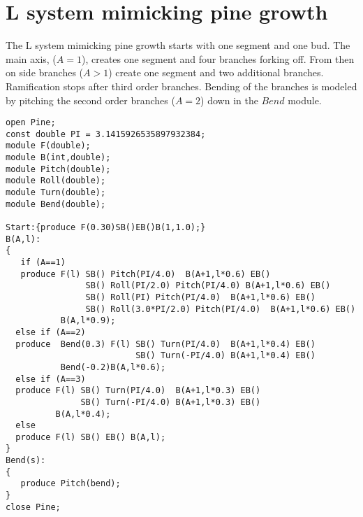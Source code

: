 \section{L system mimicking pine growth}\label{sec:L1}
The L system  mimicking pine  growth starts with  one segment  and one
bud.  The main axis, ($A  = 1$),  creates one  segment and  four branches
forking off.  From then on side  branches ($A > 1$) create one segment
and  two additional  branches.  Ramification  stops after  third order
branches. Bending  of the branches  is modeled by pitching  the second
order branches ($A = 2$) down in the $Bend$ module.

\begin{verbatim}
open Pine;
const double PI = 3.1415926535897932384;
module F(double);
module B(int,double);
module Pitch(double);
module Roll(double);
module Turn(double);
module Bend(double);

Start:{produce F(0.30)SB()EB()B(1,1.0);}
B(A,l):
{
   if (A==1)
   produce F(l) SB() Pitch(PI/4.0)  B(A+1,l*0.6) EB() 
                SB() Roll(PI/2.0) Pitch(PI/4.0) B(A+1,l*0.6) EB()
                SB() Roll(PI) Pitch(PI/4.0)  B(A+1,l*0.6) EB() 
                SB() Roll(3.0*PI/2.0) Pitch(PI/4.0)  B(A+1,l*0.6) EB()
           B(A,l*0.9);
  else if (A==2)
  produce  Bend(0.3) F(l) SB() Turn(PI/4.0)  B(A+1,l*0.4) EB() 
                          SB() Turn(-PI/4.0) B(A+1,l*0.4) EB()
           Bend(-0.2)B(A,l*0.6);
  else if (A==3)
  produce F(l) SB() Turn(PI/4.0)  B(A+1,l*0.3) EB() 
               SB() Turn(-PI/4.0) B(A+1,l*0.3) EB()
          B(A,l*0.4);
  else
  produce F(l) SB() EB() B(A,l);
}
Bend(s):
{
   produce Pitch(bend);
}
close Pine;

\end{verbatim}
